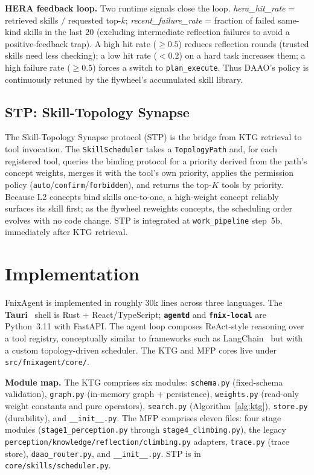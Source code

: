 \documentclass[sigconf]{acmart}
\begin{document}
\textbf{HERA feedback loop.} Two runtime signals close the loop. \textit{hera\_hit\_rate} = retrieved skills $/$ requested top-$k$; \textit{recent\_failure\_rate} = fraction of failed same-kind skills in the last 20 (excluding intermediate reflection failures to avoid a positive-feedback trap). A high hit rate ($\geq 0.5$) reduces reflection rounds (trusted skills need less checking); a low hit rate ($<0.2$) on a hard task increases them; a high failure rate ($\geq 0.5$) forces a switch to \texttt{plan\_execute}. Thus DAAO's policy is continuously retuned by the flywheel's accumulated skill library.

\subsection{STP: Skill-Topology Synapse}\label{sec:stp}

The Skill-Topology Synapse protocol (STP) is the bridge from KTG retrieval to tool invocation. The \texttt{SkillScheduler} takes a \texttt{TopologyPath} and, for each registered tool, queries the binding protocol for a priority derived from the path's concept weights, merges it with the tool's own priority, applies the permission policy (\texttt{auto}/\texttt{confirm}/\texttt{forbidden}), and returns the top-$K$ tools by priority. Because L2 concepts bind skills one-to-one, a high-weight concept reliably surfaces its skill first; as the flywheel reweights concepts, the scheduling order evolves with no code change. STP is integrated at \texttt{work\_pipeline} step~5b, immediately after KTG retrieval.

\section{Implementation}\label{sec:impl}

FnixAgent is implemented in roughly 30k lines across three languages. The \textbf{Tauri}~\cite{tauri2024} shell is Rust + React/TypeScript; \textbf{\texttt{agentd}} and \textbf{\texttt{fnix-local}} are Python~3.11 with FastAPI. The agent loop composes ReAct-style reasoning over a tool registry, conceptually similar to frameworks such as LangChain~\cite{chase2022langchain} but with a custom topology-driven scheduler. The KTG and MFP cores live under \texttt{src/fnixagent/core/}.

\textbf{Module map.} The KTG comprises six modules: \texttt{schema.py} (fixed-schema validation), \texttt{graph.py} (in-memory graph + persistence), \texttt{weights.py} (read-only weight constants and pure operators), \texttt{search.py} (Algorithm~\ref{alg:ktg}), \texttt{store.py} (durability), and \texttt{\_\_init\_\_.py}. The MFP comprises eleven files: four stage modules (\texttt{stage1\_perception.py} through \texttt{stage4\_climbing.py}), the legacy \texttt{perception/knowledge/reflection/climbing.py} adapters, \texttt{trace.py} (trace store), \texttt{daao\_router.py}, and \texttt{\_\_init\_\_.py}. STP is in \texttt{core/skills/scheduler.py}.
\end{document}
